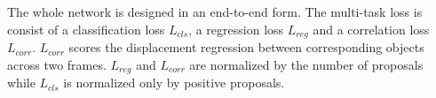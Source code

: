 \documentclass[letterpaper, 10 pt, conference]{ieeeconf}  %
\def\figurename{\emph{Figure}}
\begin{document}
The whole network is designed in an end-to-end form. The multi-task loss is consist of a classification loss $L_{cls}$, a regression loss $L_{reg}$ and a correlation loss $L_{corr}$. $L_{corr}$ scores the displacement regression between corresponding objects across two frames. $L_{reg}$ and $L_{corr}$ are normalized by the number of proposals while $L_{cls}$ is normalized only by positive proposals.



\end{document}
